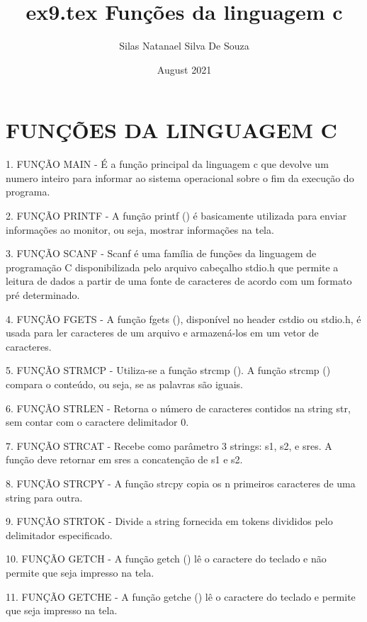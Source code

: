 \documentclass{article}
\title{ex9.tex 
Funções da linguagem c}
\author{Silas Natanael Silva De Souza}
\date{August 2021}
\begin{document}
\maketitle

\section{FUNÇÕES DA LINGUAGEM C}

1. FUNÇÃO MAIN - É a função principal da linguagem c que devolve um numero inteiro para informar ao sistema operacional sobre o fim da execução do programa.

2. FUNÇÃO PRINTF - A função printf () é basicamente utilizada para enviar informações ao monitor, ou seja, mostrar informações na tela.

3. FUNÇÃO SCANF - Scanf é uma família de funções da linguagem de programação C disponibilizada pelo arquivo cabeçalho stdio.h que permite a leitura de dados a partir de uma fonte de caracteres de acordo com um formato pré determinado.

4. FUNÇÃO FGETS - A função fgets (), disponível no header cstdio ou stdio.h, é usada para ler caracteres de um arquivo e armazená-los em um vetor de caracteres.

5. FUNÇÃO STRMCP - Utiliza-se a função strcmp (). A função strcmp () compara o conteúdo, ou seja, se as palavras são iguais.

6. FUNÇÃO STRLEN - Retorna o número de caracteres contidos na string str, sem contar com o caractere delimitador 0.

7. FUNÇÃO STRCAT - Recebe como parâmetro 3 strings: s1, s2, e sres. A função deve retornar em sres a concatenção de s1 e s2.

8. FUNÇÃO STRCPY - A função strcpy copia os n primeiros caracteres de uma string para outra.

9. FUNÇÃO STRTOK - Divide a string fornecida em tokens divididos pelo delimitador especificado.

10. FUNÇÃO GETCH - A função getch () lê o caractere do teclado e não permite que seja impresso na tela.

11. FUNÇÃO GETCHE - A função getche () lê o caractere do teclado e permite que seja impresso na tela.
\end{document}
